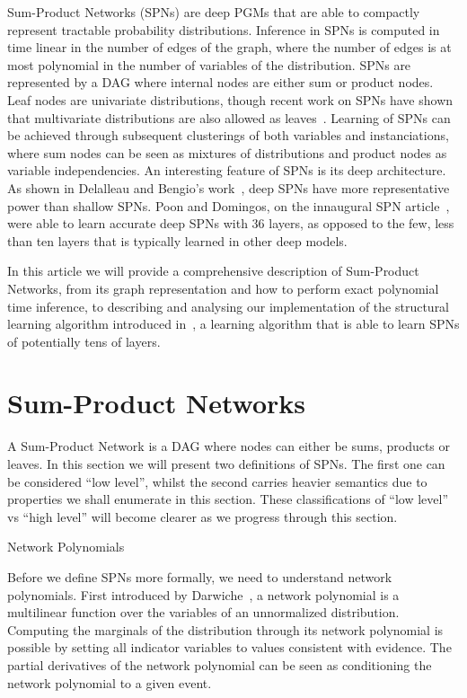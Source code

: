 \documentclass{amsart}
\makeatletter
\def\subsection{\@startsection{subsection}{3}%
  \z@{.5\linespacing\@plus.7\linespacing}{.1\linespacing}%
  {\normalfont\itshape}}
\theoremstyle{plain}
\numberwithin{equation}{section}
\makeatother
\begin{document}
Sum-Product Networks (SPNs) are deep PGMs that are able to compactly represent tractable
probability distributions. Inference in SPNs is computed in time linear in the number of edges of
the graph, where the number of edges is at most polynomial in the number of variables of the
distribution. SPNs are represented by a DAG where internal nodes are either sum or product nodes.
Leaf nodes are univariate distributions, though recent work on SPNs have shown that multivariate
distributions are also allowed as leaves~\cite{id-spn}. Learning of SPNs can be achieved through
subsequent clusterings of both variables and instanciations, where sum nodes can be seen as
mixtures of distributions and product nodes as variable independencies. An interesting feature of
SPNs is its deep architecture. As shown in Delalleau and Bengio's work~\cite{shallow-vs-deep},
deep SPNs have more representative power than shallow SPNs. Poon and Domingos, on the innaugural
SPN article~\cite{poon-domingos}, were able to learn accurate deep SPNs with 36 layers, as opposed
to the few, less than ten layers that is typically learned in other deep models.

In this article we will provide a comprehensive description of Sum-Product Networks, from its graph
representation and how to perform exact polynomial time inference, to describing and analysing our
implementation of the structural learning algorithm introduced in~\cite{gens-domingos}, a learning
algorithm that is able to learn SPNs of potentially tens of layers.

\section{Sum-Product Networks}

A Sum-Product Network is a DAG where nodes can either be sums, products or leaves. In this section
we will present two definitions of SPNs. The first one can be considered ``low level'', whilst the
second carries heavier semantics due to properties we shall enumerate in this section. These
classifications of ``low level'' vs ``high level'' will become clearer as we progress through this
section.

\subsection{Network Polynomials}

Before we define SPNs more formally, we need to understand network polynomials. First introduced by
Darwiche~\cite{diff-approach-darwiche}, a network polynomial is a multilinear function over the
variables of an unnormalized distribution. Computing the marginals of the distribution through its
network polynomial is possible by setting all indicator variables to values consistent with
evidence. The partial derivatives of the network polynomial can be seen as conditioning the network
polynomial to a given event.
\end{document}
